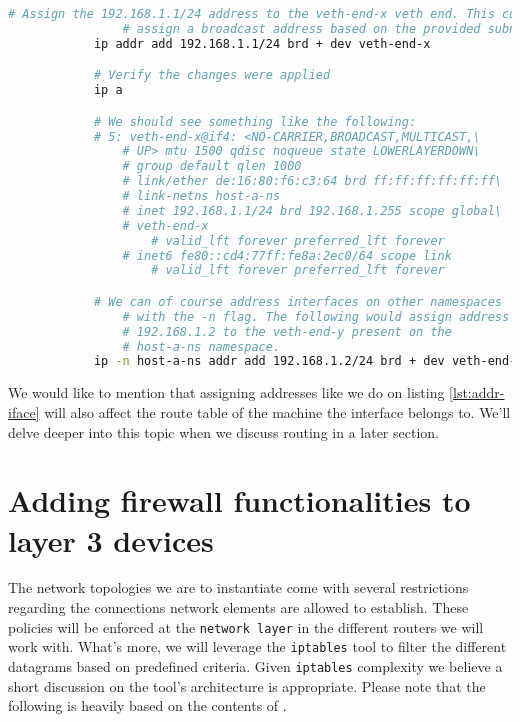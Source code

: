         \begin{lstlisting}[language = bash, caption = Addressing an inetrface., label = lst:addr-iface]
            # Assign the 192.168.1.1/24 address to the veth-end-x veth end. This command will automatically
                # assign a broadcast address based on the provided subnet mask (i.e. /24)
            ip addr add 192.168.1.1/24 brd + dev veth-end-x

            # Verify the changes were applied
            ip a

            # We should see something like the following:
            # 5: veth-end-x@if4: <NO-CARRIER,BROADCAST,MULTICAST,\
                # UP> mtu 1500 qdisc noqueue state LOWERLAYERDOWN\
                # group default qlen 1000
                # link/ether de:16:80:f6:c3:64 brd ff:ff:ff:ff:ff:ff\
                # link-netns host-a-ns
                # inet 192.168.1.1/24 brd 192.168.1.255 scope global\
                # veth-end-x
                    # valid_lft forever preferred_lft forever
                # inet6 fe80::cd4:77ff:fe8a:2ec0/64 scope link
                    # valid_lft forever preferred_lft forever

            # We can of course address interfaces on other namespaces
                # with the -n flag. The following would assign address
                # 192.168.1.2 to the veth-end-y present on the
                # host-a-ns namespace.
            ip -n host-a-ns addr add 192.168.1.2/24 brd + dev veth-end-y
        \end{lstlisting}

        We would like to mention that assigning addresses like we do on listing \ref{lst:addr-iface} will also affect the route table of the machine the interface belongs to. We'll delve deeper into this topic when we discuss routing in a later section.\\

    \section{Adding firewall functionalities to layer 3 devices}
        The network topologies we are to instantiate come with several restrictions regarding the connections network elements are allowed to establish. These policies will be enforced at the \texttt{network layer} in the different routers we will work with. What's more, we will leverage the \texttt{iptables} tool to filter the different datagrams based on predefined criteria. Given \texttt{iptables} complexity we believe a short discussion on the tool's architecture is appropriate. Please note that the following is heavily based on the contents of \cite{bib:man-iptables}.\\

